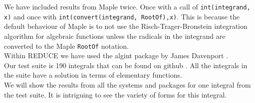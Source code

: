 \documentclass[12pt]{article}
\numberwithin{equation}{section}
\theoremstyle{definition}
\begin{document}
We have included results from Maple twice. Once with a call of \texttt{int(integrand, x)} 
and once with \texttt{int(convert(integrand, RootOf),x)}. This is because the default 
behaviour of Maple is to not use the Risch-Trager-Bronstein integration 
algorithm \cite{Trager1984}\cite{Bronstein1990} for algebraic functions unless the 
radicals in the integrand are converted to the Maple \texttt{RootOf} notation.\\

Within REDUCE we have used the algint package by James Davenport \cite{Davenport1979}. \\

Our test suite is 190 integrals that can be found on github \cite{test_suite_github}. 
All the integrals in the suite have a solution in terms of elementary functions. \\

We will show the results from all the systems and packages for one integral from the test 
suite. It is intriguing to see the variety of forms for this integral. \\
\end{document}
